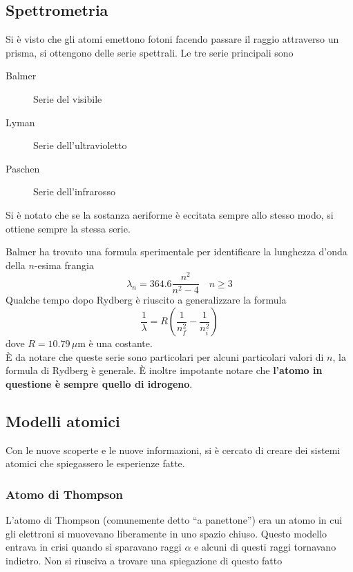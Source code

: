 \subsection{Spettrometria}
Si è visto che gli atomi emettono fotoni facendo passare il raggio attraverso un prisma, si ottengono
delle serie spettrali. Le tre serie principali sono
\begin{description}
  \item[Balmer] Serie del visibile
  \item[Lyman] Serie dell'ultravioletto
  \item[Paschen] Serie dell'infrarosso
\end{description}
Si è notato che se la sostanza aeriforme è eccitata sempre allo stesso modo, si ottiene sempre la
stessa serie.
\begin{center}
\end{center}
Balmer ha trovato una formula sperimentale per identificare la lunghezza d'onda della $n$-esima 
frangia
\begin{equation*}
  \lambda_n = 364.6 \frac{n^2}{n^2-4}\quad n\geq3
\end{equation*}
Qualche tempo dopo Rydberg è riuscito a generalizzare la formula
\begin{equation*}
  \frac{1}{\lambda}=R \left( \frac{1}{n^2_f}-\frac{1}{n^2_i} \right)
\end{equation*}
dove $R=10.79\,\mu\text{m}$ è una costante.\\
È da notare che queste serie sono particolari per alcuni particolari valori di $n$, la formula di
Rydberg è generale. È inoltre impotante notare che \textbf{l'atomo in questione è sempre quello di
idrogeno}.

\subsection{Modelli atomici}
Con le nuove scoperte e le nuove informazioni, si è cercato di creare dei sistemi atomici che 
spiegassero le esperienze fatte.
\subsubsection{Atomo di Thompson}
L'atomo di Thompson (comunemente detto ``a panettone'') era un atomo in cui gli elettroni si 
muovevano liberamente in uno spazio chiuso. Questo modello entrava in crisi quando si sparavano raggi
$\alpha$ e alcuni di questi raggi tornavano indietro. Non si riusciva a trovare una spiegazione di
questo fatto
